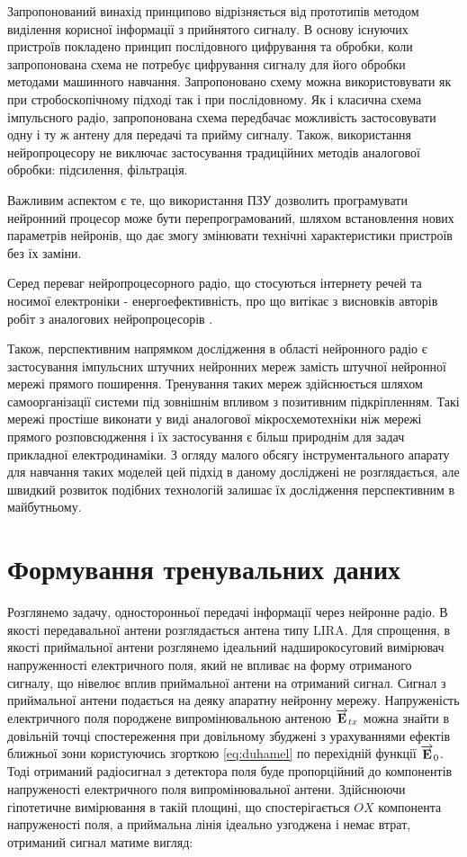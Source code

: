 Запропонований винахід принципово відрізняється від прототипів методом 
виділення корисної інформації з прийнятого сигналу. В основу існуючих
пристроїв покладено принцип послідовного цифрування та обробки, коли 
запропонована схема не потребує цифрування сигналу для його обробки 
методами машинного навчання. Запропоновано схему можна використовувати як 
при стробоскопічному підході так і при послідовному. Як і класична схема 
імпульсного радіо, запропонована схема передбачає можливість застосовувати 
одну і ту ж антену для передачі та прийму сигналу. Також, використання 
нейропроцесору не виключає застосування традиційних методів аналогової обробки:
підсилення, фільтрація.

Важливим аспектом є те, що використання ПЗУ дозволить програмувати нейронний 
процесор може бути перепрограмований, шляхом встановлення нових
параметрів нейронів, що дає змогу змінювати технічні характеристики 
пристроїв без їх заміни.

Серед переваг нейропроцесорного радіо, що стосуються інтернету речей та 
носимої електроніки - енергоефективність, про що витікає з висновків авторів 
робіт з аналогових нейропроцесорів \cite{imp:AnalogLSTM}.

Також, перспективним напрямком дослідження в області нейронного радіо є 
застосування імпульсних штучних нейронних мереж замість штучної нейронної 
мережі прямого поширення. Тренування таких мереж здійснюється шляхом 
самоорганізації системи під зовнішнім впливом з позитивним підкріпленням. 
Такі мережі простіше виконати у виді аналогової мікросхемотехніки ніж мережі
прямого розповсюдження і їх застосування є більш природнім для задач 
прикладної електродинаміки. З огляду малого обсягу інструментального 
апарату для навчання таких моделей цей підхід в даному досліджені не 
розглядається, але швидкий розвиток подібних технологій залишає їх 
дослідження перспективним в майбутньому.

\section{Формування тренувальних даних}

Розглянемо задачу, односторонньої передачі інформації через нейронне радіо. 
В якості передавальної антени розглядається антена типу LIRA. Для спрощення, 
в якості приймальної антени розглянемо ідеальний надширокосуговий вимірювач 
напруженності електричного поля, який не впливає на форму отриманого сигналу,
що нівелює вплив приймальної антени на отриманий сигнал. Сигнал з приймальної 
антени подається на деяку апаратну нейронну мережу. Напруженість електричного 
поля породжене випромінювальною антеною $ \overrightarrow{\mathbf E}_{tx} $ можна знайти в 
довільній точці спостереження при довільному збуджені з урахуваннями ефектів 
ближньої зони користуючись згорткою \eqref{eq:duhamel} по перехідній функції 
$ \overrightarrow{\mathbf E}_0 $. Тоді отриманий радіосигнал з детектора поля буде пропорційний 
до компонентів напруженості електричного поля випромінювальної антени. 
Здійснюючи гіпотетичне вимірювання в такій площині, що спостерігається $ OX $ 
компонента напруженості поля, а приймальна лінія ідеально узгоджена і немає 
втрат, отриманий сигнал матиме вигляд:

